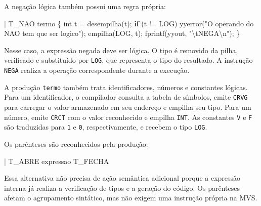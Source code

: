 \documentclass[
  brazilian,
  letterpaper,
]{book}
\newenvironment{Shaded}{\begin{snugshade}}{\end{snugshade}}
\newcommand{\CharTok}[1]{\textcolor[rgb]{0.13,0.47,0.30}{#1}}
\newcommand{\ControlFlowTok}[1]{\textcolor[rgb]{0.00,0.23,0.31}{\textbf{#1}}}
\newcommand{\DataTypeTok}[1]{\textcolor[rgb]{0.68,0.00,0.00}{#1}}
\newcommand{\NormalTok}[1]{\textcolor[rgb]{0.00,0.23,0.31}{#1}}
\newcommand{\OperatorTok}[1]{\textcolor[rgb]{0.37,0.37,0.37}{#1}}
\newcommand{\SpecialCharTok}[1]{\textcolor[rgb]{0.37,0.37,0.37}{#1}}
\newcommand{\StringTok}[1]{\textcolor[rgb]{0.13,0.47,0.30}{#1}}
\theoremstyle{plain}
\theoremstyle{definition}
\theoremstyle{remark}
\begin{document}
A negação lógica também possui uma regra própria:

\begin{Shaded}
\begin{Highlighting}[]
    \OperatorTok{|}\NormalTok{ T\_NAO termo}
      \OperatorTok{\{} 
        \DataTypeTok{int}\NormalTok{ t }\OperatorTok{=}\NormalTok{ desempilha}\OperatorTok{(}\CharTok{\textquotesingle{}t\textquotesingle{}}\OperatorTok{);}
        \ControlFlowTok{if} \OperatorTok{(}\NormalTok{t }\OperatorTok{!=}\NormalTok{ LOG}\OperatorTok{)}
\NormalTok{           yyerror}\OperatorTok{(}\StringTok{"O operando do NAO tem que ser logico"}\OperatorTok{);}
\NormalTok{        empilha}\OperatorTok{(}\NormalTok{LOG}\OperatorTok{,} \CharTok{\textquotesingle{}t\textquotesingle{}}\OperatorTok{);}
\NormalTok{        fprintf}\OperatorTok{(}\NormalTok{yyout}\OperatorTok{,} \StringTok{"}\SpecialCharTok{\textbackslash{}t}\StringTok{NEGA}\SpecialCharTok{\textbackslash{}n}\StringTok{"}\OperatorTok{);} 
      \OperatorTok{\}}
\end{Highlighting}
\end{Shaded}

Nesse caso, a expressão negada deve ser lógica. O tipo é removido da
pilha, verificado e substituído por \texttt{LOG}, que representa o tipo
do resultado. A instrução \texttt{NEGA} realiza a operação
correspondente durante a execução.

A produção \texttt{termo} também trata identificadores, números e
constantes lógicas. Para um identificador, o compilador consulta a
tabela de símbolos, emite \texttt{CRVG} para carregar o valor armazenado
em seu endereço e empilha seu tipo. Para um número, emite \texttt{CRCT}
com o valor reconhecido e empilha \texttt{INT}. As constantes \texttt{V}
e \texttt{F} são traduzidas para \texttt{1} e \texttt{0},
respectivamente, e recebem o tipo \texttt{LOG}.

Os parênteses são reconhecidos pela produção:

\begin{Shaded}
\begin{Highlighting}[]
    \OperatorTok{|}\NormalTok{ T\_ABRE expressao T\_FECHA}
\end{Highlighting}
\end{Shaded}

Essa alternativa não precisa de ação semântica adicional porque a
expressão interna já realiza a verificação de tipos e a geração do
código. Os parênteses afetam o agrupamento sintático, mas não exigem uma
instrução própria na MVS.
\end{document}

